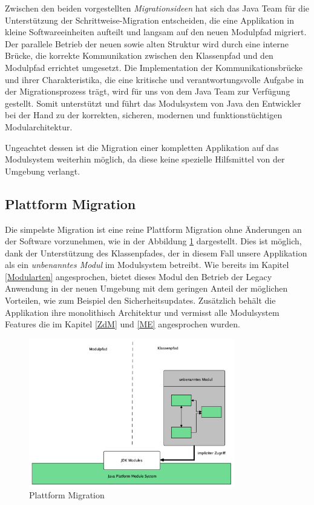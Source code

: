 	Zwischen den beiden vorgestellten \textit{Migrationsideen} hat sich das Java Team für die Unterstützung der Schrittweise-Migration entscheiden, die eine Applikation in kleine Softwareeinheiten aufteilt und langsam auf den neuen Modulpfad migriert. Der parallele Betrieb der neuen sowie alten Struktur wird durch eine interne Brücke, die korrekte Kommunikation zwischen den Klassenpfad und den Modulpfad errichtet umgesetzt. Die Implementation der Kommunikationsbrücke und ihrer Charakteristika, die eine kritische und verantwortungsvolle Aufgabe in der Migrationsprozess trägt, wird für uns von dem Java Team zur Verfügung gestellt. Somit unterstützt und führt das Modulsystem von Java den Entwickler bei der Hand zu der korrekten, sicheren, modernen und funktionstüchtigen Modularchitektur. 


	Ungeachtet dessen ist die Migration einer kompletten Applikation auf das Modulsystem weiterhin möglich, da diese keine spezielle Hilfsmittel von der Umgebung verlangt. 


\subsection{Plattform Migration}

	Die simpelste Migration ist eine reine Plattform Migration ohne Änderungen an der Software vorzunehmen, wie in der Abbildung \ref{fig:PM} dargestellt. Dies ist möglich, dank der Unterstützung des Klassenpfades, der in diesem Fall unsere Applikation als ein \textit{unbenanntes Modul} im Modulsystem betreibt. Wie bereits im Kapitel \ref{Modularten} angesprochen, bietet dieses Modul den Betrieb der Legacy Anwendung in der neuen Umgebung mit dem geringen Anteil der möglichen Vorteilen, wie zum Beispiel den Sicherheitsupdates. Zusätzlich behält die Applikation ihre monolithisch Architektur und vermisst alle Modulsystem Features die im Kapitel \ref{ZdM} und \ref{ME} angesprochen wurden.

	\begin{figure}[h]
		\centering
	    \includegraphics[width=0.8\textwidth]{material/images/plattform-migration.png}
	    \caption{Plattform Migration}
	    \label{fig:PM}
  	\end{figure}

